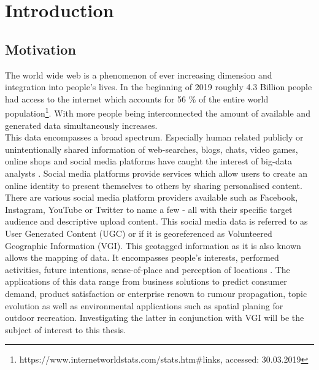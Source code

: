 \chapter{Introduction}
\section{Motivation}
The world wide web is a phenomenon of ever increasing dimension and integration into people's lives. In the beginning of 2019 roughly 4.3 Billion people had access to the internet which accounts for 56 \% of the entire world population\footnote{https://www.internetworldstats.com/stats.htm\#links, accessed: 30.03.2019}. 
With more people being interconnected the amount of available and generated data simultaneously increases.\\
This data encompasses a broad spectrum. Especially human related publicly or unintentionally shared information of web-searches, blogs, chats, video games, online shops and social media platforms have caught the interest of big-data analysts \parencite{Wu2014}. Social media platforms provide services which allow users to create an online identity to present themselves to others by sharing personalised content. There are various social media platform providers available such as Facebook, Instagram, YouTube or Twitter to name a few - all with their specific target audience and descriptive upload content. This social media data is referred to as User Generated Content (UGC) or if it is georeferenced as Volunteered Geographic Information (VGI). This geotagged information as it is also known allows the mapping of data. It encompasses people's interests, performed activities, future intentions, sense-of-place and perception of locations \parencite{Goodchild2007}. The applications of this data range from business solutions to predict consumer demand, product satisfaction or enterprise renown \parencite{Yang2019} to rumour propagation, topic evolution \parencite{Kazienko2015} as well as environmental applications such as spatial planing for outdoor recreation. Investigating the latter in conjunction with VGI will be the subject of interest to this thesis.\\

